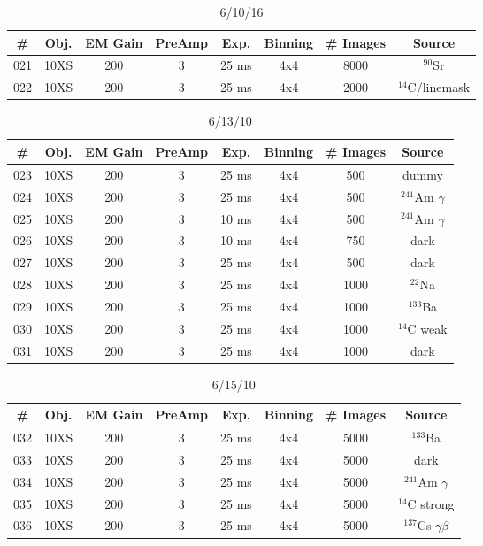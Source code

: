 \documentclass[12pt]{amsart}
\begin{document}
\begin{table}[!htbp]
	\centering
	\caption{6/10/16}
	\label{tab:table3}
	\hspace*{-1cm}
	\begin{tabular}{cccccccc}
		\toprule
		\# & Obj. & EM Gain & PreAmp & Exp. & Binning & \# Images & Source\\
		\midrule
		021 & 10XS & 200 & 3 & 25 ms & 4x4 & 8000 & $^{90}$Sr\\
		022 & 10XS & 200 & 3 & 25 ms & 4x4 & 2000 & $^{14}$C/linemask\\
		\bottomrule
	\end{tabular}
	\hspace*{-1cm}
\end{table}

\begin{table}[!htbp]
	\centering
	\caption{6/13/10}
	\label{tab:table4}
	\hspace*{-1cm}
	\begin{tabular}{cccccccc}
		\toprule
		\# & Obj. & EM Gain & PreAmp & Exp. & Binning & \# Images & Source\\
		\midrule
		023 & 10XS & 200 & 3 & 25 ms & 4x4 & 500 & dummy\\
		024 & 10XS & 200 & 3 & 25 ms & 4x4 & 500 & $^{241}$Am $\gamma$\\
		025 & 10XS & 200 & 3 & 10 ms & 4x4 & 500 & $^{241}$Am $\gamma$\\
		026 & 10XS & 200 & 3 & 10 ms & 4x4 & 750 & dark\\
		027 & 10XS & 200 & 3 & 25 ms & 4x4 & 500 & dark\\
		028 & 10XS & 200 & 3 & 25 ms & 4x4 & 1000 & $^{22}$Na\\
		029 & 10XS & 200 & 3 & 25 ms & 4x4 & 1000 & $^{133}$Ba\\
		030 & 10XS & 200 & 3 & 25 ms & 4x4 & 1000 & $^{14}$C weak\\
		031 & 10XS & 200 & 3 & 25 ms & 4x4 & 1000 & dark\\
		\bottomrule
	\end{tabular}
	\hspace*{-1cm}
\end{table}

\begin{table}[!htbp]
	\centering
	\caption{6/15/10}
	\label{tab:table5}
	\hspace*{-1cm}
	\begin{tabular}{cccccccc}
		\toprule
		\# & Obj. & EM Gain & PreAmp & Exp. & Binning & \# Images & Source\\
		\midrule
		032 & 10XS & 200 & 3 & 25 ms & 4x4 & 5000 & $^{133}$Ba\\
		033 & 10XS & 200 & 3 & 25 ms & 4x4 & 5000 & dark\\
		034 & 10XS & 200 & 3 & 25 ms & 4x4 & 5000 & $^{241}$Am $\gamma$\\
		035 & 10XS & 200 & 3 & 25 ms & 4x4 & 5000 & $^{14}$C strong\\
		036 & 10XS & 200 & 3 & 25 ms & 4x4 & 5000 & $^{137}$Cs $\gamma \beta$\\
		\bottomrule
	\end{tabular}
	\hspace*{-1cm}
\end{table}
\end{document}
